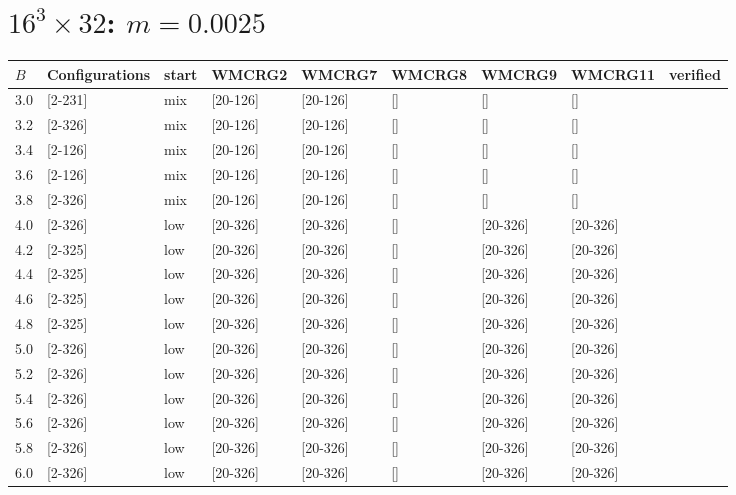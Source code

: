 \documentclass{article}
\begin{document}
  \section*{$16^3\times32$:  $m=0.0025$}
    \begin{tabular}{| l | l | l | l | l | l | l | l | l |}
      \hline
      $B$ & Configurations & start & WMCRG2 & WMCRG7 & WMCRG8 & WMCRG9 & WMCRG11 & verified\\
      \hline
      3.0 & [2-231] & mix & [20-126] & [20-126] & [] & [] & [] &\\
      3.2 & [2-326] & mix & [20-126] & [20-126] & [] & [] & [] &\\
      3.4 & [2-126] & mix & [20-126] & [20-126] & [] & [] & [] &\\
      3.6 & [2-126] & mix & [20-126] & [20-126] & [] & [] & [] &\\
      3.8 & [2-326] & mix & [20-126] & [20-126] & [] & [] & [] &\\
      4.0 & [2-326] & low & [20-326] & [20-326] & [] & [20-326] & [20-326] &\\
      4.2 & [2-325] & low & [20-326] & [20-326] & [] & [20-326] & [20-326] &\\
      4.4 & [2-325] & low & [20-326] & [20-326] & [] & [20-326] & [20-326] &\\
      4.6 & [2-325] & low & [20-326] & [20-326] & [] & [20-326] & [20-326] &\\
      4.8 & [2-325] & low & [20-326] & [20-326] & [] & [20-326] & [20-326] &\\
      5.0 & [2-326] & low & [20-326] & [20-326] & [] & [20-326] & [20-326] &\\
      5.2 & [2-326] & low & [20-326] & [20-326] & [] & [20-326] & [20-326] &\\
      5.4 & [2-326] & low & [20-326] & [20-326] & [] & [20-326] & [20-326] &\\
      5.6 & [2-326] & low & [20-326] & [20-326] & [] & [20-326] & [20-326] &\\
      5.8 & [2-326] & low & [20-326] & [20-326] & [] & [20-326] & [20-326] &\\
      6.0 & [2-326] & low & [20-326] & [20-326] & [] & [20-326] & [20-326] &\\
      \hline
    \end{tabular}
\end{document}
